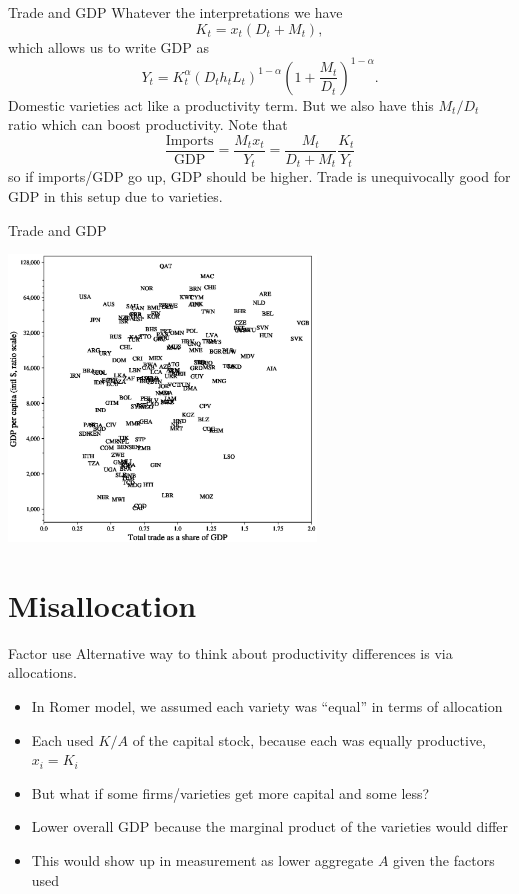 \begin{frame}{Trade and GDP}
Whatever the interpretations we have
\begin{equation}
	K_t = x_t(D_t + M_t), \nonumber
\end{equation}
which allows us to write GDP as
\begin{equation}
	Y_t = K_t^{\alpha}(D_th_tL_t)^{1-\alpha}\left(1+\frac{M_t}{D_t}\right)^{1-\alpha}. \nonumber
\end{equation}
Domestic varieties act like a productivity term. But we also have this $M_t/D_t$ ratio which can boost productivity. Note that
\begin{equation}
	\frac{\text{Imports}}{\text{GDP}} = \frac{M_tx_t}{Y_t} = \frac{M_t}{D_t+M_t}\frac{K_t}{Y_t}
\end{equation}
so if imports/GDP go up, GDP should be higher. Trade is unequivocally good for GDP in this setup due to varieties.
\end{frame}

\begin{frame}{Trade and GDP}
\begin{center}
\includegraphics[height=3in]{../Figures/fig-ch7-fig3.eps}
\end{center}
\end{frame}


\section{Misallocation}
\begin{frame}{Factor use}
Alternative way to think about productivity differences is via allocations.
\begin{itemize}
	\item In Romer model, we assumed each variety was ``equal'' in terms of allocation
	\item Each used $K/A$ of the capital stock, because each was equally productive, $x_i = K_i$
	\item But what if some firms/varieties get more capital and some less? 
	\item Lower overall GDP because the marginal product of the varieties would differ
	\item This would show up in measurement as lower aggregate $A$ given the factors used
\end{itemize}
\end{frame}

